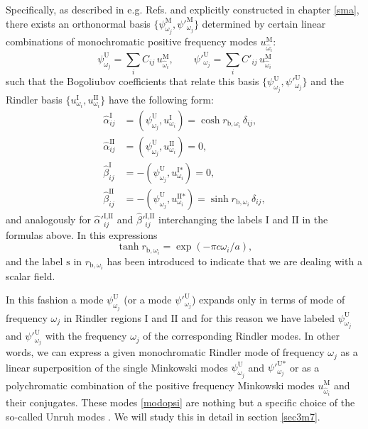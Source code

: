 Specifically, as described in e.g. Refs. \cite{Unruh,Takagi,Birrell} and
explicitly constructed in chapter \ref{sma}, there exists an orthonormal basis
$\{\psi_{\omega_j}^\text{M}, \psi'^{\text{M}}_{\omega_j}\}$ determined by certain linear
combinations of monochromatic positive frequency modes 
$u^\text{M}_{\hat\omega_i}$:
\begin{equation}\label{modopsi}
\psi^\text{U}_{\omega_j}=\sum_i C_{ij}\, u_{\hat\omega_i}^\text{M},\qquad \psi'^{\text{U}}_{\omega_j}=\sum_i C'_{ij}\, u_{\hat\omega_i}^\text{M} 
\end{equation}
 such that the Bogoliubov coefficients that relate this basis
 $\{\psi_{\omega_j}^\text{U},\psi'^{\text{U}}_{\omega_j}\}$  and the Rindler basis
 $\{u^\text{I}_{\omega_i},u^\text{II}_{\omega_i}\}$ have the following form:
 \begin{align}\label{bogo1}
\hat\alpha^{\text{I}}_{ij}
&=\left(\psi_{\omega_j}^\text{U},u_{\omega_i}^\text{I}\right)=\cosh r_{\text{b},\omega_i}\,\delta_{ij},
\nonumber\\
\hat\alpha^{\text{II}}_{ij}
&=\left(\psi_{\omega_j}^\text{U},u_{\omega_i}^{\text{II}}\right)=0,\nonumber\\
\hat\beta^{\text{I}}_{ij}
&=-\left(\psi_{\omega_j}^{\text{U}},u_{\omega_i}^{\text{I}*}\right) = 0,
\nonumber\\
\hat\beta^{\text{II}}_{ij}&=-\left(\psi_{\omega_j}^{\text{U}},u_{\omega_i}^{\text{II}*}\right)= \sinh r_{\text{b},\omega_i}\,\delta_{ij},
\end{align}
and analogously for $\hat\alpha'^{\text{I,II}}_{ij}$ and $\hat\beta'^{\text{I,II}}_{ij}$ interchanging the labels $\text{I}$ and $\text{II}$ in the formulas above. In this expressions
\begin{equation}\label{defr1}
\tanh r_{\text{b},\omega_i}=\exp(-\pi c {\omega_i }/{a}),
\end{equation}
and the label $\text{s}$ in $r_{\text{b},\omega_i}$ has been introduced to
indicate that we are dealing with a scalar field. %

In this fashion a mode $\psi_{\omega_j}^\text{U}$ (or a mode $\psi'^{\text{U}}_{\omega_j}$) expands only in
terms of mode of frequency $\omega_j$ in Rindler regions
$\text{I}$ and $\text{II}$ and for this reason we have labeled $\psi_{\omega_j}^\text{U}$ and $\psi'^{\text{U}}_{\omega_j}$  with the frequency $\omega_j$ of the corresponding Rindler modes. In other words, we can express a given
monochromatic Rindler mode of frequency $\omega_j$   as a linear
superposition of the single Minkowski modes $\psi_{\omega_j}^{\text{U}}$ and $\psi'^{\text{U}*}_{\omega_j}$ or as a polychromatic combination of the
positive frequency Minkowski modes $u^\text{M}_{\hat\omega_i}$ and
their conjugates. These modes \eqref{modopsi} are nothing but a specific choice of the so-called Unruh modes \cite{Wald2,Birrell,NavarroSalas}. We will study this in detail in section \ref{sec3m7}.

